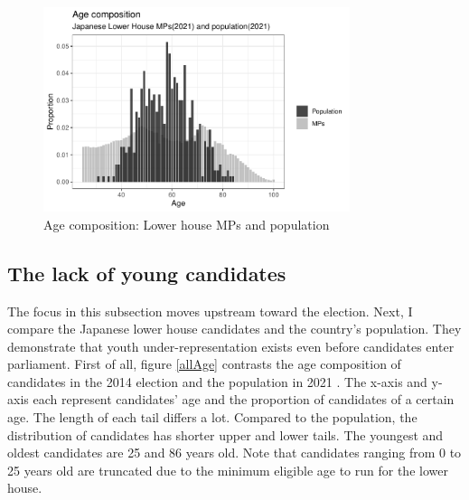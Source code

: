 \documentclass[a4paper, 12pt]{article}\usepackage[dvipdfmx]{graphicx}\usepackage[]{xcolor}
\begin{document}
\begin{figure}
\centering
  \includegraphics[width=0.8\textwidth]{figure/comp_age/comp_mp.pdf}
  \caption{Age composition: Lower house MPs and population}
  \label{mp}
\end{figure}

\subsection{The lack of young candidates}

The focus in this subsection moves upstream toward the election. Next, I compare the Japanese lower house candidates and the country's population. They demonstrate that youth under-representation exists even before candidates enter parliament. First of all, figure \ref{allAge} contrasts the age composition of candidates in the 2014 election and the population in 2021 \footnotemark{}. The x-axis and y-axis each represent candidates' age and the proportion of candidates of a certain age. The length of each tail differs a lot. Compared to the population, the distribution of candidates has shorter upper and lower tails. The youngest and oldest candidates are 25 and 86 years old. Note that candidates ranging from 0 to 25 years old are truncated due to the minimum eligible age to run for the lower house. 
\end{document}
